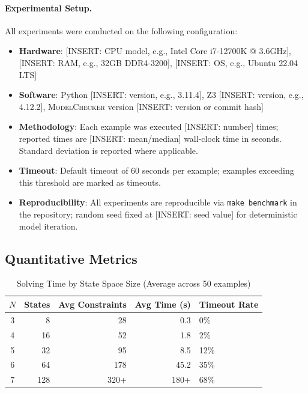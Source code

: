 \documentclass[pdflatex,sn-mathphys-num]{sn-jnl}
\newcommand{\modelchecker}{\textsc{ModelChecker}}
\theoremstyle{thmstyleone}
\theoremstyle{thmstyletwo}
\theoremstyle{thmstylethree}
\begin{document}
\paragraph{Experimental Setup.}
All experiments were conducted on the following configuration:
\begin{itemize}
    \item \textbf{Hardware}: [INSERT: CPU model, e.g., Intel Core i7-12700K @ 3.6GHz], [INSERT: RAM, e.g., 32GB DDR4-3200], [INSERT: OS, e.g., Ubuntu 22.04 LTS]
    \item \textbf{Software}: Python [INSERT: version, e.g., 3.11.4], Z3 [INSERT: version, e.g., 4.12.2], \modelchecker{} version [INSERT: version or commit hash]
    \item \textbf{Methodology}: Each example was executed [INSERT: number] times; reported times are [INSERT: mean/median] wall-clock time in seconds.
    Standard deviation is reported where applicable.
    \item \textbf{Timeout}: Default timeout of 60 seconds per example; examples exceeding this threshold are marked as timeouts.
    \item \textbf{Reproducibility}: All experiments are reproducible via \texttt{make benchmark} in the repository; random seed fixed at [INSERT: seed value] for deterministic model iteration.
\end{itemize}

\subsection{Quantitative Metrics}\label{sec:metrics}

\begin{table}[htbp]
\centering
\caption{Solving Time by State Space Size (Average across 50 examples)}
\label{tab:performance}
\begin{tabular}{@{}crrrl@{}}
\toprule
$N$ & \textbf{States} & \textbf{Avg Constraints} & \textbf{Avg Time (s)} & \textbf{Timeout Rate} \\
\midrule
3 & 8 & 28 & 0.3 & 0\% \\
4 & 16 & 52 & 1.8 & 2\% \\
5 & 32 & 95 & 8.5 & 12\% \\
6 & 64 & 178 & 45.2 & 35\% \\
7 & 128 & 320+ & 180+ & 68\% \\
\bottomrule
\end{tabular}
\end{table}
\end{document}
